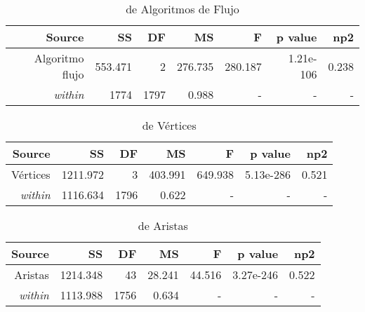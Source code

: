 \documentclass{article}
\begin{document}
\begin{table}[H]
\caption{{\small de Algoritmos de Flujo}}
\begin{center}		
	\centering
		\begin{tabular}{|r|r|r|r|r|r|r|}		
			\hline
			\textbf{Source} & \textbf{SS} & \textbf{DF} & \textbf{MS}& \textbf{F}& \textbf{p value} & \textbf{np2}\\
			
			\hline
			 Algoritmo flujo & 553.471 & 2 &276.735 & 280.187 &1.21e-106 & 0.238 \\
			 \textit{within}    & 1774& 1797 & 0.988 & - & - & - \\			 			 
			\hline
		\end{tabular}
		\label{cual}
	\label{tab:una-tablita}
\end{center}	
\end{table}

\begin{table}[H]
\caption{{\small de Vértices}}
\begin{center}		
	\centering
		\begin{tabular}{|r|r|r|r|r|r|r|}		
			\hline
			\textbf{Source} & \textbf{SS} & \textbf{DF} & \textbf{MS}& \textbf{F}& \textbf{p value} & \textbf{np2}\\
			
			\hline
			 Vértices & 1211.972 & 3 & 403.991 & 649.938 & 5.13e-286 & 0.521 \\
			 \textit{within}    & 1116.634& 1796 & 0.622 & - & - & - \\			 			 
			\hline
		\end{tabular}
		\label{cual}
	\label{tab:una-tablita}
\end{center}	
\end{table}

\begin{table}[H]
\caption{{\small de Aristas}}
\begin{center}		
	\centering
		\begin{tabular}{|r|r|r|r|r|r|r|}		
			\hline
			\textbf{Source} & \textbf{SS} & \textbf{DF} & \textbf{MS}& \textbf{F}& \textbf{p value} & \textbf{np2}\\
			
			\hline
			 Aristas & 1214.348 & 43 & 28.241 & 44.516 & 3.27e-246 & 0.522 \\
			 \textit{within}    & 1113.988& 1756 & 0.634 & - & - & - \\			 			 
			\hline
		\end{tabular}
		\label{cual}
	\label{tab:una-tablita}
\end{center}	
\end{table}
\end{document}

